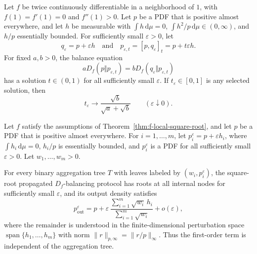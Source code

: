 \documentclass[10pt,a4paper]{amsart}
\newcommand{\dd}{\,\mathrm{d}}
\begin{document}
\begin{theorem}
\label{thm:f-local-square-root}
Let $f$ be twice continuously differentiable in a neighborhood of $1$, with
$f(1)=f'(1)=0$ and $f''(1)>0$. Let $p$ be a PDF that is positive almost everywhere, and let $h$ be measurable with
$\int h\dd\mu=0$, $\int h^2/p\dd\mu\in(0,\infty)$, and $h/p$
essentially bounded. For sufficiently small $\varepsilon>0$, let
\[q_\varepsilon=p+\varepsilon h
  \quad\text{and}\quad
  p_{\varepsilon,t}=[p,q_\varepsilon]_t=p+t\varepsilon h .
\]
For fixed $a,b>0$, the balance equation
\begin{equation}
  aD_f(p\Vert p_{\varepsilon,t})
  =
  bD_f(q_\varepsilon\Vert p_{\varepsilon,t})
  \label{eq:f-balance-local}
\end{equation}
has a solution $t\in(0,1)$ for all sufficiently small $\varepsilon$. If $t_\varepsilon\in[0,1]$ is any selected solution, then
\begin{equation}
  t_\varepsilon\longrightarrow
  \frac{\sqrt b}{\sqrt a+\sqrt b}
  \qquad (\varepsilon\downarrow0).
  \label{eq:sqrt-local-limit}
\end{equation}
\end{theorem}

\begin{corollary}
\label{cor:sqrt-first-order}
Let $f$ satisfy the assumptions of Theorem~\ref{thm:f-local-square-root}, and
let $p$ be a PDF that is positive almost everywhere. For $i=1,\ldots,m$, let
$p_i^\varepsilon=p+\varepsilon h_i$, where $\int h_i\dd\mu=0$, $h_i/p$
is essentially bounded, and $p_i^\varepsilon$ is a PDF for all sufficiently
small $\varepsilon>0$. Let $w_1,\ldots,w_m>0$.

For every binary aggregation tree $T$ with leaves labeled by
$(w_i,p_i^\varepsilon)$, the square-root propagated $D_f$-balancing protocol
has roots at all internal nodes for sufficiently small $\varepsilon$, and its
output density satisfies
\begin{equation}
  p^\varepsilon_{\mathrm{out}}
  =
  p+\varepsilon\,
  \frac{\sum_{i=1}^m \sqrt{w_i}\,h_i}{\sum_{i=1}^m\sqrt{w_i}}
  +o(\varepsilon),
  \label{eq:first-order-square-root}
\end{equation}
where the remainder is understood in the finite-dimensional perturbation space
$\operatorname{span}\{h_1,\ldots,h_m\}$ with norm
$\|r\|_{p,\infty}=\|r/p\|_\infty$. Thus the first-order term is
independent of the aggregation tree.
\end{corollary}
\end{document}
